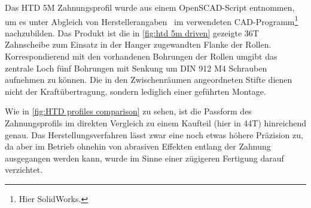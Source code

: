 		Das HTD 5M Zahnungsprofil wurde aus einem OpenSCAD-Script\cite{thingiverse.tooth.profiles.2012} entnommen, um es unter Abgleich von Herstellerangaben~\cite{gates.catalogue.2021,GatesCorporation.drive.design.manual.2014} im verwendeten CAD-Programm\footnote{\hspace{1mm} Hier SolidWorks.} nachzubilden.
		Das Produkt ist die in \cref{fig:htd 5m driven} gezeigte 36T Zahnscheibe zum Einsatz in der Hanger zugewandten Flanke der Rollen.
		Korrespondierend mit den vorhandenen Bohrungen der Rollen umgibt das zentrale Loch fünf Bohrungen mit Senkung um DIN 912 M4 Schrauben aufnehmen zu können.
		Die in den Zwischenräumen angeordneten Stifte dienen nicht der Kraftübertragung, sondern lediglich einer geführten Montage.
		
		Wie in \cref{fig:HTD profiles comparison} zu sehen, ist die Passform des Zahnungsprofils im direkten Vergleich zu einem Kaufteil (hier in 44T) hinreichend genau.
		Das Herstellungsverfahren lässt zwar eine noch etwas höhere Präzision zu, da aber im Betrieb ohnehin von abrasiven Effekten entlang der Zahnung ausgegangen werden kann, wurde im Sinne einer zügigeren Fertigung darauf verzichtet.
